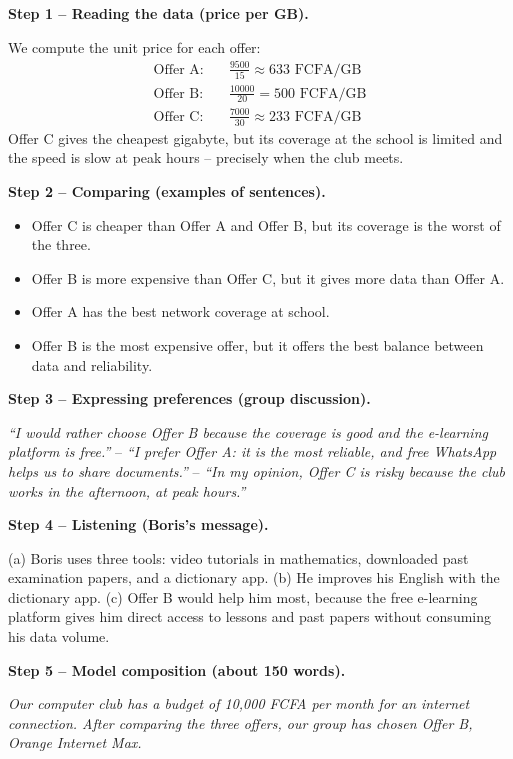 \documentclass[11pt]{article}
\begin{document}
\begin{exoresolu}
\textbf{Step 1 -- Reading the data (price per GB).}

We compute the unit price for each offer:
\begin{align*}
\text{Offer A:} \quad & \frac{9500}{15} \approx 633 \text{ FCFA/GB}\\
\text{Offer B:} \quad & \frac{10000}{20} = 500 \text{ FCFA/GB}\\
\text{Offer C:} \quad & \frac{7000}{30} \approx 233 \text{ FCFA/GB}
\end{align*}
Offer C gives the cheapest gigabyte, but its coverage at the school is limited and the speed is slow at peak hours -- precisely when the club meets.

\tcblower
\textbf{Step 2 -- Comparing (examples of sentences).}

\begin{itemize}
\item Offer C is cheaper than Offer A and Offer B, but its coverage is the worst of the three.
\item Offer B is more expensive than Offer C, but it gives more data than Offer A.
\item Offer A has the best network coverage at school.
\item Offer B is the most expensive offer, but it offers the best balance between data and reliability.
\end{itemize}

\textbf{Step 3 -- Expressing preferences (group discussion).}

\emph{``I would rather choose Offer B because the coverage is good and the e-learning platform is free.''} -- \emph{``I prefer Offer A: it is the most reliable, and free WhatsApp helps us to share documents.''} -- \emph{``In my opinion, Offer C is risky because the club works in the afternoon, at peak hours.''}

\textbf{Step 4 -- Listening (Boris's message).}

(a) Boris uses three tools: video tutorials in mathematics, downloaded past examination papers, and a dictionary app. (b) He improves his English with the dictionary app. (c) Offer B would help him most, because the free e-learning platform gives him direct access to lessons and past papers without consuming his data volume.

\textbf{Step 5 -- Model composition (about 150 words).}

\emph{Our computer club has a budget of 10,000 FCFA per month for an internet connection. After comparing the three offers, our group has chosen Offer B, Orange Internet Max.}


\end{exoresolu}
\end{document}
